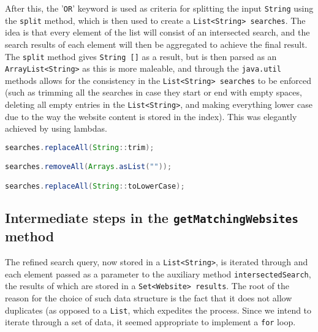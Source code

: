 After this, the '{\tt OR}' keyword is used as criteria for splitting the input {\tt String} using the {\tt split} method, which is then used to create a {\tt List<String> searches}. The idea is that every element of the list will consist of an intersected search, and the search results of each element will then be aggregated to achieve the final result.
The {\tt split} method gives {\tt String []} as a result, but is then parsed as an {\tt ArrayList<String>} as this is more maleable, and through the {\tt java.util} methods allows for the consistency in the {\tt List<String> searches} to be enforced (such as trimming all the searches in case they start or end with empty spaces, deleting all empty entries in the {\tt List<String>}, and making everything lower case due to the way the website content is stored in the index). This was elegantly achieved by using lambdas.

\begin{lstlisting}[language=Java]
searches.replaceAll(String::trim);

searches.removeAll(Arrays.asList(""));

searches.replaceAll(String::toLowerCase);
\end{lstlisting}

\subsection{Intermediate steps in the {\tt getMatchingWebsites} method}
The refined search query, now stored in a {\tt List<String>}, is iterated through and each element passed as a parameter to the auxiliary method {\tt intersectedSearch}, the results of which are stored in a {\tt Set<Website> results}. The root of the reason for the choice of such data structure is the fact that it does not allow duplicates (as opposed to a {\tt List}, which expedites the process. Since we intend to iterate through a set of data, it seemed appropriate to implement a {\tt for} loop.
